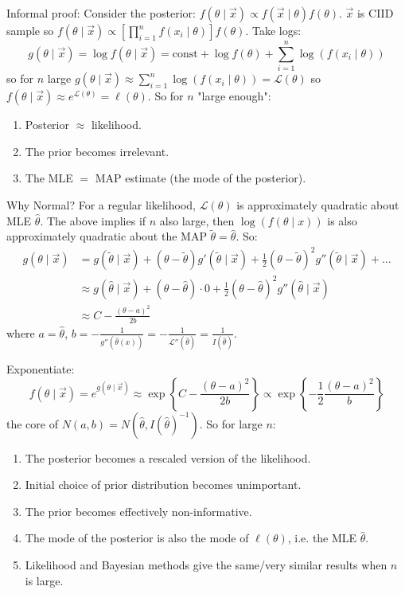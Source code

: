 \documentclass[10pt, a4paper]{article}
\begin{document}
Informal proof:
Consider the posterior:
$f(\theta \mid \vec{x}) \propto f(\vec{x} \mid \theta)f(\theta)$.
$\vec{x}$ is CIID sample so $f(\theta \mid \vec{x}) \propto \left[\prod_{i = 1}^{n}f(x_i \mid \theta)\right]f(\theta)$.
Take logs:
\[
g(\theta \mid \vec{x}) = \log{f(\theta \mid \vec{x})} = \text{const} + \log{f(\theta)} + \sum_{i = 1}^{n}\log(f(x_i \mid\theta))
\]
so for $n$ large $g(\theta \mid \vec{x}) \approx \sum_{i = 1}^{n}\log(f(x_i \mid \theta)) = \mathcal{L}(\theta)$ so $f(\theta \mid \vec{x}) \approx e ^ {\mathcal{L}(\theta)} = \ell(\theta)$.
So for $n$
"large enough":
\begin{enumerate}[label = (\roman*)]
    \item Posterior $\approx$ likelihood.

    \item The prior becomes irrelevant.

    \item The MLE $=$ MAP estimate
    (the mode of the posterior).
\end{enumerate}
Why Normal?
For a regular likelihood,
$\mathcal{L}(\theta)$ is approximately quadratic about MLE $\hat{\theta}$.
The above implies if $n$ also large,
then $\log(f(\theta \mid x))$ is also approximately quadratic about the MAP $\tilde{\theta} = \hat{\theta}$.
So:
\begin{align*}
    g(\theta \mid \vec{x}) &= g(\tilde{\theta} \mid \vec{x}) + (\theta - \tilde{\theta})g'(\tilde{\theta} \mid \vec{x}) + \frac{1}{2}(\theta - \tilde{\theta}) ^ 2g''(\tilde{\theta} \mid \vec{x}) + \dotsc \\
    &\approx g(\hat{\theta} \mid \vec{x}) + (\theta - \hat{\theta}) \cdot 0 + \frac{1}{2}(\theta - \hat{\theta}) ^ 2g''(\hat{\theta} \mid \vec{x}) \\
    &\approx C - \frac{(\theta - a) ^ 2}{2b}
\end{align*}
where $a = \hat{\theta}$,
$b = -\frac{1}{g''(\hat{\theta}(x))} = -\frac{1}{\mathcal{L}''(\hat{\theta})} = \frac{1}{I(\hat{\theta})}$.

Exponentiate:
\[
f(\theta \mid \vec{x}) = e ^ {g(\theta \mid \vec{x})} \approx \exp\left\{C - \frac{(\theta - a) ^ 2}{2b}\right\} \propto \exp\left\{-\frac{1}{2}\frac{(\theta - a) ^ 2}{b}\right\}
\]
the core of $N(a, b) = N(\hat{\theta}, I(\hat{\theta}) ^ {-1})$.
So for large $n$:
\begin{enumerate}[label = (\roman*)]
    \item The posterior becomes a rescaled version of the likelihood.

    \item Initial choice of prior distribution becomes unimportant.

    \item The prior becomes effectively non-informative.

    \item The mode of the posterior is also the mode of $\ell(\theta)$,
    i.e. the MLE $\hat{\theta}$.

    \item Likelihood and Bayesian methods give the same/very similar results when $n$ is large.
\end{enumerate}
\end{document}
